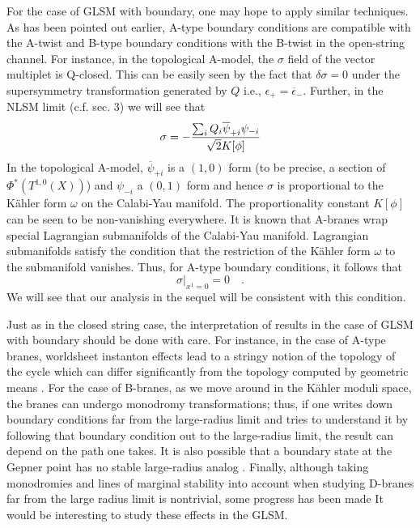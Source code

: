 \documentclass[a4paper,12pt]{article}
\begin{document}
For the case of GLSM with boundary, one may hope to apply similar
techniques. As has been pointed out earlier\cite{ooy},
A-type boundary conditions
are compatible with the A-twist and B-type boundary conditions with
the B-twist in the open-string channel. 
For instance, in the topological
A-model, the $\sigma$ field of the vector multiplet is Q-closed.
This can be easily seen by the fact that $\delta \sigma=0$ under
the supersymmetry transformation generated by $Q$ i.e.,
$\epsilon_+=\overline{\epsilon}_-$. Further, in the NLSM limit
(c.f. sec. 3) we will see that
$$
\sigma = -{{\sum_i Q_i \overline{\psi}_{+i}\psi_{-i}}\over{\sqrt2
K[\phi]}} 
$$
In the topological A-model, 
$\overline{\psi}_{+i}$ is a $(1,0)$ form 
(to be precise, a section of $\Phi^*(T^{1,0}(X))$)
and $\psi_{-i}$ a $(0,1)$ form and hence $\sigma$ is proportional
to the K\"ahler form $\omega$ on the Calabi-Yau manifold. The proportionality
constant $K[\phi]$ can be seen to be non-vanishing everywhere. It is known
that A-branes wrap special Lagrangian submanifolds of the Calabi-Yau 
manifold. Lagrangian submanifolds satisfy the condition that the restriction
of the K\"ahler form $\omega$ to the submanifold vanishes. Thus, 
for A-type boundary conditions, it follows that
\begin{equation}
\sigma|_{x^1=0} =0\quad.
\end{equation}
We will see that our analysis in the sequel will be consistent 
with this condition. 

Just as in the closed string case, the interpretation of results
in the case of GLSM with boundary should be done with care.
For instance, in the case of A-type branes,
worldsheet instanton effects lead to a stringy
notion of the topology of the cycle
which can differ significantly from the
topology computed by geometric means \cite{kklm2}.
For the case of B-branes, as we move around
in the K\"ahler moduli space, the branes
can undergo monodromy transformations; thus,
if one writes down boundary conditions far from
the large-radius limit and tries to understand
it by following that boundary condition out
to the large-radius limit, the result can depend
on the path one takes. It is also possible that
a boundary state at the Gepner point has no stable large-radius analog
\cite{doug1,dfr}.
Finally, although taking monodromies and
lines of marginal stability into account when studying D-branes far
from the large radius limit is nontrivial, some progress has been made 
\cite{quintic,doug1,dfr} It would be interesting to study
these effects in the GLSM.
\end{document}
